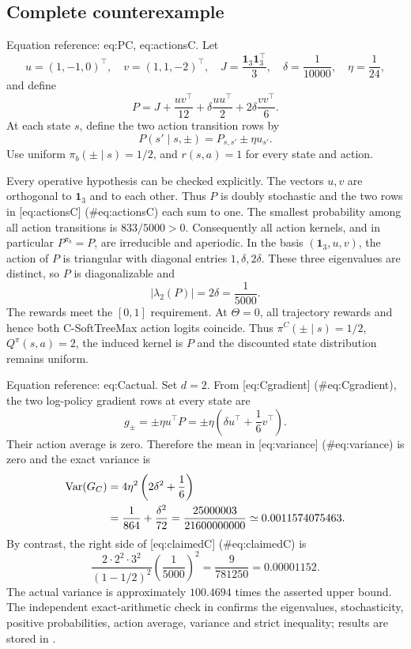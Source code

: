 \documentclass[10pt]{article}
\begin{document}
\subsection*{Complete counterexample}
Equation reference: eq:PC, eq:actionsC. Let \[u=(1,-1,0)^\top,\quad v=(1,1,-2)^\top,\quad
 J=\frac{\mathbf{1}_3\mathbf{1}_3^\top}{3},\quad
 \delta=\frac1{10000},\quad \eta=\frac1{24},\] and define \[
 P=J+\frac{uv^\top}{12}
       +\delta\frac{uu^\top}{2}
       +2\delta\frac{vv^\top}{6}.\] At each state \(s\), define the two action transition rows by \[
 P(s'\mid s,\pm)=P_{s,s'}\pm\eta u_{s'}.\] Use uniform \(\pi_b(\pm\mid s)=1/2\), and \(r(s,a)=1\) for every state and action.\par
Every operative hypothesis can be checked explicitly. The vectors \(u,v\) are orthogonal to \(\mathbf{1}_3\) and to each other. Thus \(P\) is doubly stochastic and the two rows in [eq:actionsC] (\#eq:actionsC) each sum to one. The smallest probability among all action transitions is \(833/5000>0\). Consequently all action kernels, and in particular \(P^{\pi_b}=P\), are irreducible and aperiodic. In the basis \((\mathbf{1}_3,u,v)\), the action of \(P\) is triangular with diagonal entries \(1,\delta,2\delta\). These three eigenvalues are distinct, so \(P\) is diagonalizable and \[|\lambda_2(P)|=2\delta=\frac1{5000}.\] The rewards meet the \([0,1]\) requirement. At \(\Theta=0\), all trajectory rewards and hence both C-SoftTreeMax action logits coincide. Thus \(\pi^C(\pm\mid s)=1/2\), \(Q^\pi(s,a)=2\), the induced kernel is \(P\) and the discounted state distribution remains uniform.\par
Equation reference: eq:Cactual. Set \(d=2\). From [eq:Cgradient] (\#eq:Cgradient), the two log-policy gradient rows at every state are \[g_\pm=\pm\eta u^\top P
       =\pm\eta\left(\delta u^\top+\frac16v^\top\right).\] Their action average is zero. Therefore the mean in [eq:variance] (\#eq:variance) is zero and the exact variance is \[\begin{aligned}
 \operatorname{Var}(G_C)
 &=4\eta^2\left(2\delta^2+\frac16\right) \notag\\
 &=\frac1{864}+\frac{\delta^2}{72}
   =\frac{25000003}{21600000000}
   \simeq 0.0011574075463. \end{aligned}\] By contrast, the right side of [eq:claimedC] (\#eq:claimedC) is \[\frac{2\cdot2^2\cdot3^2}{(1-1/2)^2}
 \left(\frac1{5000}\right)^2
 =\frac9{781250}=0.00001152.\] The actual variance is approximately \(100.4694\) times the asserted upper bound. The independent exact-arithmetic check in confirms the eigenvalues, stochasticity, positive probabilities, action average, variance and strict inequality; results are stored in .\par
\end{document}
